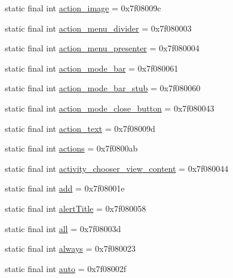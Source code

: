 \begin{CompactItemize}
\item 
static final int \hyperlink{classandroid_1_1support_1_1v4_1_1_r_1_1id_97c577266604aa2fd82ced11f039e160}{action\_\-image} = 0x7f08009c
\item 
static final int \hyperlink{classandroid_1_1support_1_1v4_1_1_r_1_1id_360731debcc399da50b8bb6f33e18cec}{action\_\-menu\_\-divider} = 0x7f080003
\item 
static final int \hyperlink{classandroid_1_1support_1_1v4_1_1_r_1_1id_d404311470ea55f116f54c30f1f35c06}{action\_\-menu\_\-presenter} = 0x7f080004
\item 
static final int \hyperlink{classandroid_1_1support_1_1v4_1_1_r_1_1id_e15c6230ec6f69f77d9e7c101c7cc091}{action\_\-mode\_\-bar} = 0x7f080061
\item 
static final int \hyperlink{classandroid_1_1support_1_1v4_1_1_r_1_1id_d69d69a2fac3d9b133dd78e7744f05b7}{action\_\-mode\_\-bar\_\-stub} = 0x7f080060
\item 
static final int \hyperlink{classandroid_1_1support_1_1v4_1_1_r_1_1id_8d78396a16e429bdb3734ff6ca62bd88}{action\_\-mode\_\-close\_\-button} = 0x7f080043
\item 
static final int \hyperlink{classandroid_1_1support_1_1v4_1_1_r_1_1id_76fa83f1383b563f8cb56bc3ac334147}{action\_\-text} = 0x7f08009d
\item 
static final int \hyperlink{classandroid_1_1support_1_1v4_1_1_r_1_1id_a294821655293ae35b50071cbdd55758}{actions} = 0x7f0800ab
\item 
static final int \hyperlink{classandroid_1_1support_1_1v4_1_1_r_1_1id_c06fc34c54206f7cac7c625a2f80e29a}{activity\_\-chooser\_\-view\_\-content} = 0x7f080044
\item 
static final int \hyperlink{classandroid_1_1support_1_1v4_1_1_r_1_1id_851cf32fc3bf6fb48832c4042f8121b3}{add} = 0x7f08001e
\item 
static final int \hyperlink{classandroid_1_1support_1_1v4_1_1_r_1_1id_9e49ca03230a91da0cb9e18c8cc095a1}{alertTitle} = 0x7f080058
\item 
static final int \hyperlink{classandroid_1_1support_1_1v4_1_1_r_1_1id_2217ae3bd7e8ade259a6a522c0052a86}{all} = 0x7f08003d
\item 
static final int \hyperlink{classandroid_1_1support_1_1v4_1_1_r_1_1id_38384bb2e3802d254f1e5aa48ade4559}{always} = 0x7f080023
\item 
static final int \hyperlink{classandroid_1_1support_1_1v4_1_1_r_1_1id_655887bcef7a5e320fa308e316d001bc}{auto} = 0x7f08002f
\item 

\end{CompactItemize}

